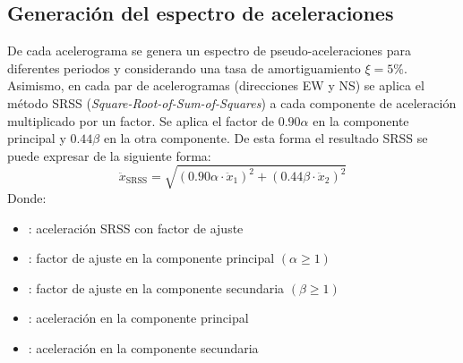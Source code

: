 \subsection{Generación del espectro de aceleraciones}
De cada acelerograma se genera un espectro de pseudo-aceleraciones para diferentes periodos y considerando una tasa de amortiguamiento $\xi = 5\%$. Asimismo, en cada par de acelerogramas (direcciones EW y NS) se aplica el método SRSS (\textit{Square-Root-of-Sum-of-Squares}) a cada componente de aceleración multiplicado por un factor. Se aplica el factor de $0.90\alpha$ en la componente principal y $0.44\beta$ en la otra componente. De esta forma el resultado SRSS se puede expresar de la siguiente forma:
\begin{equation}
    \ddot{x}_{\text{SRSS}} = \sqrt{(0.90\alpha \cdot \ddot{x}_1)^2 + (0.44\beta \cdot \ddot{x}_2)^2} \label{eq3_1}
\end{equation}
Donde:
\begin{itemize}
    \item{}: aceleración SRSS con factor de ajuste
    \item{\makebox[1cm][l]{$\alpha$}}: factor de ajuste en la componente principal $(\alpha \geq 1)$
    \item{\makebox[1cm][l]{$\beta$}}: factor de ajuste en la componente secundaria $(\beta \geq 1)$
    \item{}: aceleración en la componente principal
    \item{}: aceleración en la componente secundaria
\end{itemize}

